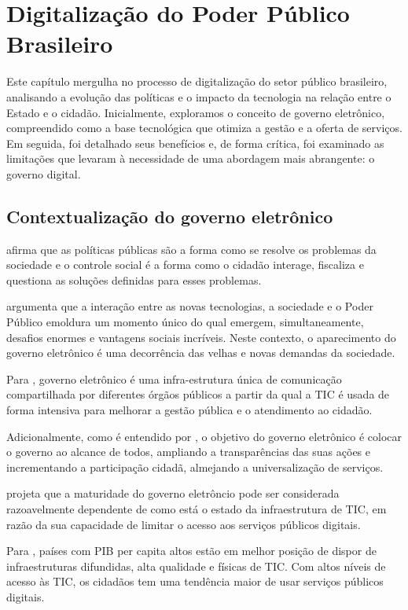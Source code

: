 \chapter{Digitalização do Poder Público Brasileiro}

Este capítulo mergulha no processo de digitalização do setor público brasileiro, analisando a evolução das políticas e o impacto da tecnologia na relação entre o Estado e o cidadão. Inicialmente, exploramos o conceito de governo eletrônico, compreendido como a base tecnológica que otimiza a gestão e a oferta de serviços. Em seguida, foi detalhado seus benefícios e, de forma crítica, foi examinado as limitações que levaram à necessidade de uma abordagem mais abrangente: o governo digital.

\section{Contextualização do governo eletrônico}

\cite{tavares2022governo} afirma que as políticas públicas são a forma como se resolve os problemas da sociedade e o controle social é a forma como o cidadão interage, fiscaliza e questiona as soluções definidas para esses problemas. 

\cite{rover2009introduccao} argumenta que a interação entre as novas tecnologias, a sociedade e o Poder Público emoldura um momento único do qual emergem, simultaneamente, desafios enormes e vantagens sociais incríveis. Neste contexto, o aparecimento do governo eletrônico é uma decorrência das velhas e novas demandas da sociedade.

Para \cite{rover2009introduccao}, governo eletrônico é uma infra-estrutura única de comunicação compartilhada por diferentes órgãos públicos a partir da qual a TIC é usada de forma intensiva para melhorar a gestão pública e o atendimento ao cidadão.

Adicionalmente, como é entendido por \cite{rover2009introduccao}, o objetivo do governo eletrônico é colocar o governo ao alcance de todos, ampliando a transparências das suas ações e incrementando a participação cidadã, almejando a universalização de serviços.

\cite{singh2007country} projeta que a maturidade do governo eletrôncio pode ser considerada razoavelmente dependente de como está o estado da infraestrutura de TIC, em razão da sua capacidade de limitar o acesso aos serviços públicos digitais. 

Para \cite{singh2007country}, países com PIB per capita altos estão em melhor posição de dispor de infraestruturas difundidas, alta qualidade e físicas de TIC. Com altos níveis de acesso às TIC, os cidadãos tem uma tendência maior de usar serviços públicos digitais.

